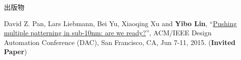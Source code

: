 \begin{rSection}{出版物}
\begin{description}[font=\normalfont]
{}
            

\item[{[C1]}]{
        David Z. Pan, Lars Liebmann, Bei Yu, Xiaoqing Xu and \textbf{Yibo Lin}, 
    ``\href{http://dl.acm.org/citation.cfm?id=2744769.2747940}{Pushing multiple patterning in sub-10nm: are we ready?}'', 
    ACM/IEEE Design Automation Conference (DAC), San Francisco, CA, Jun 7-11, 2015.
    (\textbf{Invited Paper})
}
            

\end{description}
    

\end{rSection}


